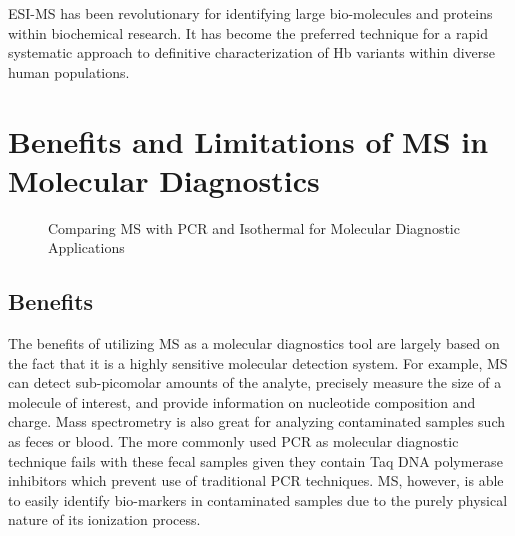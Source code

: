 \documentclass[letterpaper, 10 pt, conference]{ieeeconf}  %
\begin{document}
           ESI-MS has been revolutionary for identifying large bio-molecules and proteins within biochemical research. It has become the preferred technique for a rapid systematic approach to definitive characterization of Hb variants within diverse human populations.\autocite{R6}

    \section{\textbf{Benefits and Limitations of MS in Molecular Diagnostics}}
        
    \begin{figure}[h]
        \centering
    
        \caption{Comparing MS with PCR and Isothermal for Molecular Diagnostic Applications}
    \end{figure}

        \subsection[\textbf{Benefits}]{\textbf{Benefits\autocite{R1}}}

The benefits of utilizing MS as a molecular diagnostics tool are largely based on the fact that it is a highly sensitive molecular detection system. For example, MS can detect sub-picomolar amounts of the analyte, precisely measure the size of a molecule of interest, and provide information on nucleotide composition and charge. 
Mass spectrometry is also great for analyzing contaminated samples such as feces or blood. The more commonly used PCR as molecular diagnostic technique fails with these fecal samples given they contain Taq DNA polymerase inhibitors which prevent use of traditional PCR techniques.\autocite{R11} MS, however, is able to easily identify bio-markers in contaminated samples due to the purely physical nature of its ionization process.
\end{document}
